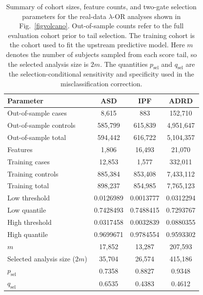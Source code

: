 \documentclass[pdflatex,sn-mathphys-num]{sn-jnl}%
\newcommand{\SPOR}{\textrm{$\lambda$-OR}}
\theoremstyle{thmstyleone}%
\theoremstyle{thmstyletwo}%
\theoremstyle{thmstylethree}%
\begin{document}
\begin{table}[t]
\centering
\caption{Summary of cohort sizes, feature counts, and two-gate selection parameters for the real-data $\SPOR$ analyses shown in Fig.~\ref{figvolcano}. Out-of-sample counts refer to the full evaluation cohort prior to tail selection. The training cohort is the cohort used to fit the upstream predictive model. Here \(m\) denotes the number of subjects sampled from each score tail, so the selected analysis size is \(2m\). The quantities \(p_{\mathrm{sel}}\) and \(q_{\mathrm{sel}}\) are the selection-conditional sensitivity and specificity used in the misclassification correction.}
\label{tab:realdata_summary}
\begin{tabular}{lccc}
\toprule
Parameter & ASD & IPF & ADRD \\
\midrule
Out-of-sample cases      & 8,615     & 883       & 152,710   \\
Out-of-sample controls   & 585,799   & 615,839   & 4,951,647 \\
Out-of-sample total      & 594,442   & 616,722   & 5,104,357 \\
Features                 & 1,806     & 16,493    & 21,070    \\
Training cases           & 12,853    & 1,577     & 332,011   \\
Training controls        & 885,384   & 853,408   & 7,433,112 \\
Training total           & 898,237   & 854,985   & 7,765,123 \\
Low threshold            & 0.0126989 & 0.0013777 & 0.0312294 \\
Low quantile             & 0.7428493 & 0.7488415 & 0.7293767 \\
High threshold           & 0.0317458 & 0.0032839 & 0.0880355 \\
High quantile            & 0.9699671 & 0.9784554 & 0.9593302 \\
\(m\)                    & 17,852    & 13,287    & 207,593   \\
Selected analysis size (\(2m\)) & 35,704 & 26,574 & 415,186 \\
\(p_{\mathrm{sel}}\)     & 0.7358    & 0.8827    & 0.9348    \\
\(q_{\mathrm{sel}}\)     & 0.6535    & 0.4383    & 0.4612    \\
\bottomrule
\end{tabular}
\end{table}
\end{document}
